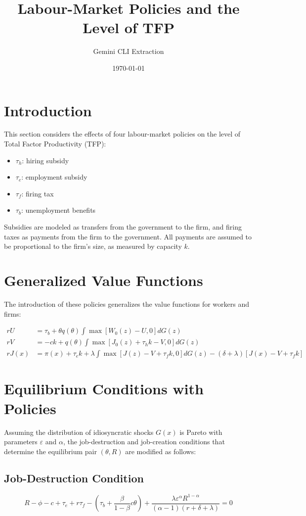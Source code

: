 \documentclass[11pt]{article}
\title{Labour-Market Policies and the Level of TFP}
\author{Gemini CLI Extraction}
\date{\today}
\begin{document}
\maketitle

\section{Introduction}
This section considers the effects of four labour-market policies on the level of Total Factor Productivity (TFP):
\begin{itemize}
    \item $\tau_h$: hiring subsidy
    \item $\tau_e$: employment subsidy
    \item $\tau_f$: firing tax
    \item $\tau_b$: unemployment benefits
\end{itemize}
Subsidies are modeled as transfers from the government to the firm, and firing taxes as payments from the firm to the government. All payments are assumed to be proportional to the firm's size, as measured by capacity $k$.

\section{Generalized Value Functions}
The introduction of these policies generalizes the value functions for workers and firms:

\begin{align}
rU &= \tau_b + \theta q(\theta) \int \max[W_0(z) - U, 0] dG(z) \\
rV &= -ck + q(\theta) \int \max[J_0(z) + \tau_h k - V, 0] dG(z) \\
rJ(x) &= \pi(x) + \tau_e k + \lambda \int \max[J(z) - V + \tau_f k, 0] dG(z) - (\delta + \lambda)[J(x) - V + \tau_f k]
\end{align}

\section{Equilibrium Conditions with Policies}
Assuming the distribution of idiosyncratic shocks $G(x)$ is Pareto with parameters $\varepsilon$ and $\alpha$, the job-destruction and job-creation conditions that determine the equilibrium pair $(\theta, R)$ are modified as follows:

\subsection{Job-Destruction Condition}
\begin{equation}
R - \phi - c + \tau_e + r\tau_f - \left( \tau_b + \frac{\beta}{1-\beta} c \theta \right) + \frac{\lambda \varepsilon^\alpha R^{1-\alpha}}{(\alpha - 1)(r + \delta + \lambda)} = 0
\end{equation}
\end{document}
